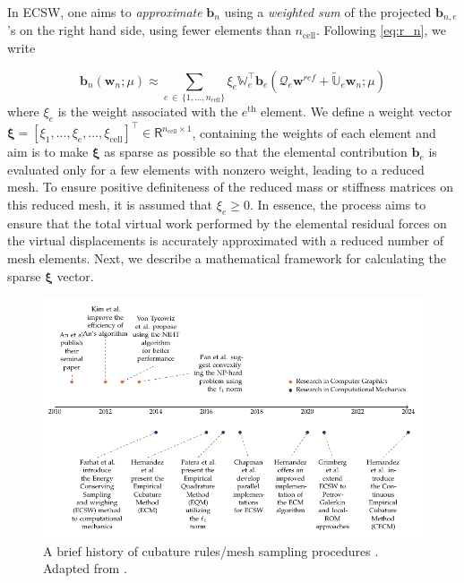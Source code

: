 \documentclass[11pt]{article}
\renewcommand{\vec}[1]{\mathbf{#1}}
\begin{document}
        In ECSW, one aims to \textit{approximate} $\vec{b}_n$ using a \textit{weighted sum} of the projected $\vec{b}_{n,e}$'s on the right hand side, using fewer elements than $n_{\text{cell}}$.
        Following \cref{eq:r_n}, we write


        \begin{equation}
        \vec{b}_n(\vec{w}_n; \mu) \approx \sum_{e\,\in\,\{1,...,n_{\text{cell}}\}} \xi_e \mathbb{W}_e^{\top} \vec{b}_e (\mathcal{Q}_e\vec{w}^{ref} + \widetilde{\mathbb{U}}_e\vec{w}_n; \mu)
        \label{eq:r_n_approx}
        \end{equation}
        where $\xi_{e}$ is the weight associated with the $e^{\text{th}}$ element.
        We define a weight vector $\boldsymbol{\xi}=\left[\xi_1,...,\xi_e,...,\xi_{\text{cell}}\right]^{\top}\in\mathsf{R}^{n_{\text{cell}}\times 1}$, containing the weights of each element and aim is to make $\boldsymbol{\xi} $ as sparse as possible so that the elemental contribution $\vec{b}_e$ is evaluated only for a few elements with nonzero weight, leading to a reduced mesh.
        To ensure positive definiteness of the reduced mass or stiffness matrices on this reduced mesh, it is assumed that $\xi_e\geq 0$.
        In essence, the process aims to ensure that the total virtual work performed by the elemental residual forces on the virtual displacements is accurately approximated with a reduced number of mesh elements.
        Next, we describe a mathematical framework for calculating the sparse $\boldsymbol\xi$ vector.












        \begin{figure}
                \centering
                \includegraphics[width=\linewidth]{PAT.pdf}
            \caption{A brief history of cubature rules/mesh sampling procedures \cite{an2009optimizing,kim2013subspace,von2013efficient,pan2015subspace,farhat2014dimensional,chapman2016accelerated,Patera_2017_EQP,hernandez2020multiscale,grimberg2021mesh,hernandez2024cecm}. Adapted from \cite{bravo2024subspace}.}
            \label{fig:PTA_LIT}
        \end{figure}
\end{document}

